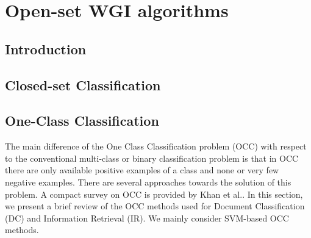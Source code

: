 
\chapter{Open-set WGI algorithms}

\label{chap:openset}


\newcommand{\keyword}[1]{\textbf{#1}}
\newcommand{\tabhead}[1]{\textbf{#1}}
\newcommand{\code}[1]{\texttt{#1}}
\newcommand{\file}[1]{\texttt{\bfseries#1}}
\newcommand{\option}[1]{\texttt{\itshape#1}}


\section{Introduction}\label{chap:openset:sec:intro}

\section{Closed-set Classification}\label{chap:openset:sec:Closed_Set_Classification} 

\section{One-Class Classification}\label{chap:openset:sec:One_Class_Classification}

The main difference of the One Class Classification problem (OCC) with respect to the conventional multi-class or binary classification problem is that in OCC there are only available positive examples of a class and none or very few negative examples. There are several approaches towards the solution of this problem. A compact survey on OCC is provided by Khan et al.\cite{khan2010survey}. In this section, we present a brief review of the OCC methods used for Document Classification (DC) and Information Retrieval (IR). We mainly consider SVM-based OCC methods.

